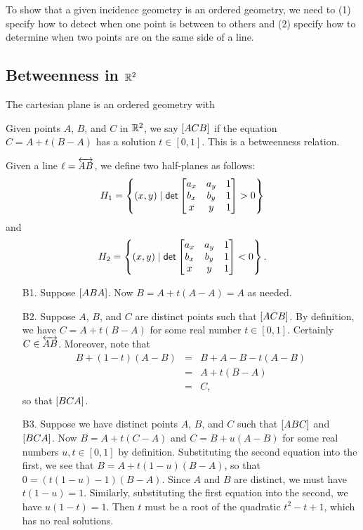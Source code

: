 To show that a given incidence geometry is an ordered geometry, we need to (1) specify how to detect when one point is between to others and (2) specify how to determine when two points are on the same side of a line.

\subsection{Betweenness in \(\mathbb{R}^2\)}

\begin{prop}
The cartesian plane is an ordered geometry with 
\begin{proplist}
\item Given points \(A\), \(B\), and \(C\) in \(\mathbb{R}^2\), we say \([ A C B ]\) if the equation \(C = A + t(B-A)\) has a solution \(t \in [0,1]\). This is a betweenness relation.
\item Given a line \(\ell = \overleftrightarrow{AB}\), we define two half-planes as follows: \[ H_1 = \left\{ (x, y) \mid \mathsf{det} \begin{bmatrix} a_x & a_y & 1 \\ b_x & b_y & 1 \\ x & y & 1 \end{bmatrix} > 0 \right\} \] and \[ H_2 = \left\{ (x, y) \mid \mathsf{det} \begin{bmatrix} a_x & a_y & 1 \\ b_x & b_y & 1 \\ x & y & 1 \end{bmatrix} < 0 \right\}. \]
\end{proplist}
\end{prop}


\begin{itemize}
\item[B1.] Suppose \([ A B A ]\). Now \(B = A + t(A - A) = A\) as needed.
\item[B2.] Suppose \(A\), \(B\), and \(C\) are distinct points such that \([ A C B ]\). By definition, we have \(C = A + t(B-A)\) for some real number \(t \in [0,1]\). Certainly \(C \in \overleftrightarrow{AB}\). Moreover, note that
\begin{eqnarray*}
B + (1-t)(A-B) & = & B + A - B - t(A-B) \\
 & = & A + t(B-A) \\
 & = & C,
\end{eqnarray*}
so that \([ B C A ]\).
\item[B3.] Suppose we have distinct points \(A\), \(B\), and \(C\) such that \([ A B C ]\) and \([ B C A ]\).
Now \(B = A + t(C-A)\) and \(C = B + u(A-B)\) for some real numbers \(u,t \in [0,1]\) by definition.
Substituting the second equation into the first, we see that \(B = A + t(1-u)(B - A)\), so that \(0 = (t(1-u) - 1)(B - A)\). Since \(A\) and \(B\) are distinct, we must have \(t(1-u) = 1\). Similarly, substituting the first equation into the second, we have \(u(1-t) = 1\). Then \(t\) must be a root of the quadratic \(t^2 - t + 1\), which has no real solutions.
\end{itemize}

